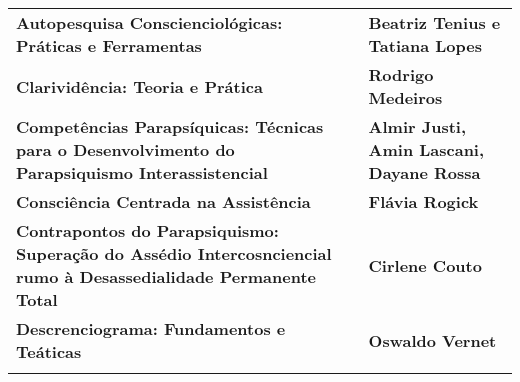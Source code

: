 \documentclass[
]{article}
\begin{document}
\begin{longtable}[]{@{}
  >{\raggedright\arraybackslash}p{}
  >{\raggedright\arraybackslash}p{}@{}}
\begin{minipage}[b]{\linewidth}\raggedright
\textbf{Autopesquisa Conscienciológicas: Práticas e Ferramentas}
\end{minipage} & \begin{minipage}[b]{\linewidth}\raggedright
\textbf{Beatriz Tenius e Tatiana Lopes}
\end{minipage} \\
\begin{minipage}[b]{\linewidth}\raggedright
\textbf{Clarividência: Teoria e Prática}
\end{minipage} & \begin{minipage}[b]{\linewidth}\raggedright
\textbf{Rodrigo Medeiros}
\end{minipage} \\
\begin{minipage}[b]{\linewidth}\raggedright
\textbf{Competências Parapsíquicas: Técnicas para o Desenvolvimento do Parapsiquismo Interassistencial}
\end{minipage} & \begin{minipage}[b]{\linewidth}\raggedright
\textbf{Almir Justi, Amin Lascani, Dayane Rossa}
\end{minipage} \\
\begin{minipage}[b]{\linewidth}\raggedright
\textbf{Consciência Centrada na Assistência}
\end{minipage} & \begin{minipage}[b]{\linewidth}\raggedright
\textbf{Flávia Rogick}
\end{minipage} \\
\begin{minipage}[b]{\linewidth}\raggedright
\textbf{Contrapontos do Parapsiquismo: Superação do Assédio Intercosnciencial rumo à Desassedialidade Permanente Total}
\end{minipage} & \begin{minipage}[b]{\linewidth}\raggedright
\textbf{Cirlene Couto}
\end{minipage} \\
\begin{minipage}[b]{\linewidth}\raggedright
\textbf{Descrenciograma: Fundamentos e Teáticas}
\end{minipage} & \begin{minipage}[b]{\linewidth}\raggedright
\textbf{Oswaldo Vernet}
\end{minipage} \\
\begin{minipage}[b]{\linewidth}\raggedright

\end{minipage}
\end{longtable}
\end{document}
